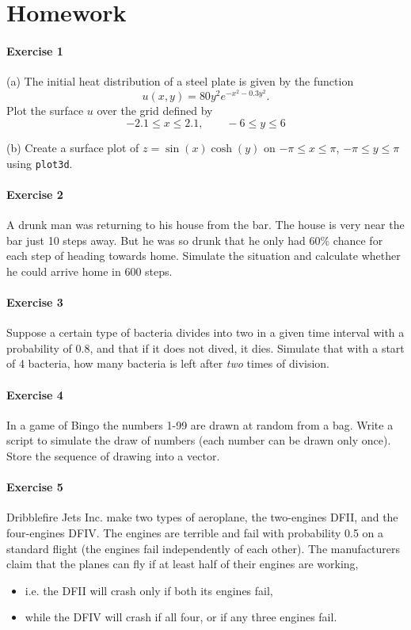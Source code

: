 \documentclass[a4paper]{book}
\begin{document}
\section{Homework}
\paragraph{Exercise 1}
(a) The initial heat distribution of a steel plate is
given by the function
\[
u(x,y) = 80 y^2 e^{- x^2 - 0.3 y^2}.
\]
Plot the surface $u$ over the grid defined by
\[
-2.1 \leq x \leq 2.1, \qquad -6 \leq y \leq 6
\]

(b) Create a surface plot of $z=\sin(x)\cosh(y)$ on 
$-\pi \leq x \leq \pi$, $-\pi \leq y \leq \pi$ using
{\tt plot3d}.



\paragraph{Exercise 2}
A drunk man was returning to his house from the bar. The
house is very near the bar just 10 steps away. But he was so
drunk that he only had 60\% chance for each step of heading
towards home. Simulate the situation and calculate whether
he could arrive home in 600 steps.

\paragraph{Exercise 3}
Suppose a certain type of bacteria divides into two in a given
time interval with a probability of 0.8, and that if it does not
dived, it dies. Simulate that with a start of 4 bacteria, how
many bacteria is left after \emph{two} times of division.

\paragraph{Exercise 4}
In a game of Bingo the numbers 1-99 are drawn at random
from a bag. Write a script to simulate the draw of numbers
(each number can be drawn only once). Store the sequence
of drawing into a vector.

\paragraph{Exercise 5}
Dribblefire Jets Inc. make two types of aeroplane, the two-engines
DFII, and the four-engines DFIV. The engines are terrible and fail with
probability 0.5 on a standard flight (the engines fail independently of
each other). The manufacturers claim that the planes can fly if at least
half of their engines are working,\begin{itemize}
\item i.e. the DFII will crash only if both its engines fail,
\item while the DFIV will crash if all four, or if any three engines fail.
\end{itemize}
\end{document}

